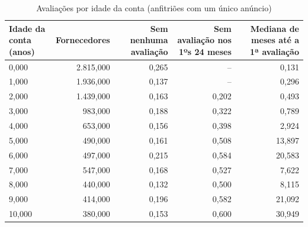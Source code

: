 \begin{table}[ht]
\centering
\caption{Avaliações por idade da conta (anfitriões com um único anúncio)}
\label{tab:avaliacao_por_idade_conta}
\begin{tabular}{lrrrr}
\hline
\textbf{Idade da conta (anos)} & \textbf{Fornecedores} & \textbf{Sem nenhuma avaliação} & \textbf{Sem avaliação nos 1ºs 24 meses} & \textbf{Mediana de meses até a 1ª avaliação} \\
\hline
0,000 & 2.815,000 & 0,265 & -- & 0,131 \\
1,000 & 1.936,000 & 0,137 & -- & 0,296 \\
2,000 & 1.439,000 & 0,163 & 0,202 & 0,493 \\
3,000 & 983,000 & 0,188 & 0,322 & 0,789 \\
4,000 & 653,000 & 0,156 & 0,398 & 2,924 \\
5,000 & 490,000 & 0,161 & 0,508 & 13,897 \\
6,000 & 497,000 & 0,215 & 0,584 & 20,583 \\
7,000 & 547,000 & 0,168 & 0,527 & 7,622 \\
8,000 & 440,000 & 0,132 & 0,500 & 8,115 \\
9,000 & 414,000 & 0,196 & 0,582 & 21,092 \\
10,000 & 380,000 & 0,153 & 0,600 & 30,949 \\
\hline
\end{tabular}
\end{table}
